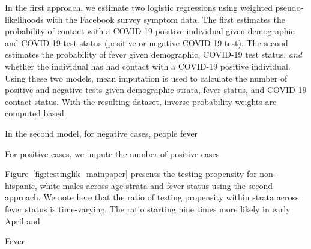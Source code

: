 \documentclass[11pt]{amsart}
\numberwithin{equation}{section}
\theoremstyle{plain}
\begin{document}
In the first approach, we estimate two logistic regressions using weighted pseudo-likelihoods with the Facebook survey symptom data.  The first estimates the probability of contact with a COVID-19 positive individual given demographic and COVID-19 test status (positive or negative COVID-19 test). The second estimates the probability of fever given demographic, COVID-19 test status, \emph{and} whether the individual has had contact with a COVID-19 positive individual.  Using these two models, mean imputation is used to calculate the number of positive and negative tests given demographic strata, fever status, and COVID-19 contact status.  With the resulting dataset, inverse probability weights are computed based.

In the second model, for negative cases,  people fever

For positive cases, we impute the number of positive cases

Figure~\ref{fig:testinglik_mainpaper} presents the testing propensity for non-hispanic, white males across age strata and fever status using the second approach.  We note here that the ratio of testing propensity within strata across fever status is time-varying.  The ratio starting nine times more likely in early April and

Fever
\end{document}
